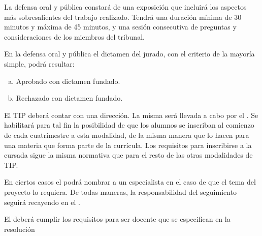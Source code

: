 \articulo La defensa oral y pública constará de una exposición que incluirá
los aspectos más sobresalientes del trabajo realizado. Tendrá una duración mínima de
30 minutos y máxima de 45 minutos, y una sesión consecutiva de preguntas y
consideraciones de los miembros del tribunal.

\articulo En la defensa oral y pública el dictamen del jurado, con el criterio
de la mayoría simple, podrá resultar: 
\begin{enumerate}[a.]
\item Aprobado con dictamen fundado.
\item Rechazado con dictamen fundado.
\end{enumerate}







\articulo El TIP deberá contar con una dirección. La misma será llevada a
cabo por el \profesorTIP . Se habilitará para tal fin la posibilidad de que los alumnos 
se inscriban al comienzo de cada cuatrimestre a esta modalidad, de la misma manera que lo 
hacen para una materia que forma parte de la currícula. Los requisitos para inscribirse a 
la cursada sigue la misma normativa que para el resto de las otras modalidades de TIP.

\articulo En ciertos casos el \profesorTIP podrá nombrar a un especialista en el caso de que el
tema del proyecto lo requiera. De todas maneras, la responsabilidad del seguimiento seguirá recayendo
en el \profesorTIP .

\articulo El \profesorTIP deberá cumplir los requisitos para ser docente que se especifican en la
resolución %

